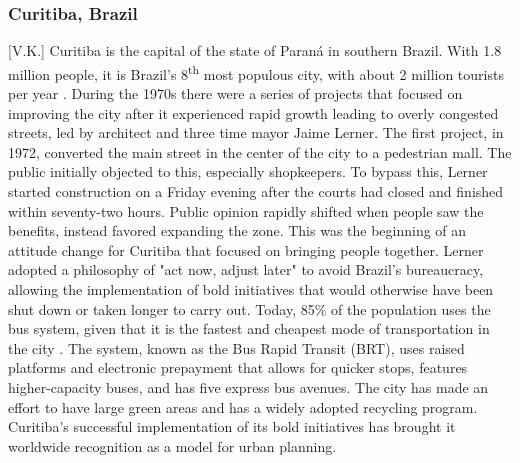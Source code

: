 \documentclass[12pt]{article}                       %
\begin{document}
\subsubsection{Curitiba, Brazil}[V.K.]
Curitiba is the capital of the state of Paraná in southern Brazil. With 1.8 million people, it is Brazil's 8\textsuperscript{th} most populous city, with about 2 million tourists per year \cite{Adler2016StoryCapital}. During the 1970s there were a series of projects that focused on improving the city after it experienced rapid growth leading to overly congested streets, led by architect and three time mayor Jaime Lerner. The first project, in 1972, converted the main street in the center of the city to a pedestrian mall. The public initially objected to this, especially shopkeepers. To bypass this, Lerner started construction on a Friday evening after the courts had closed and finished within seventy-two hours. Public opinion rapidly shifted when people saw the benefits, instead favored expanding the zone. This was the beginning of an attitude change for Curitiba that focused on bringing people together. Lerner adopted a philosophy of "act now, adjust later" to avoid Brazil's bureaucracy, allowing the implementation of bold initiatives that would otherwise have been shut down or taken longer to carry out. Today, 85\% of the population uses the bus system, given that it is the fastest and cheapest mode of transportation in the city \cite{Adler2016StoryCapital}. The system, known as the Bus Rapid Transit (BRT), uses raised platforms and electronic prepayment that allows for quicker stops, features higher-capacity buses, and has five express bus avenues. The city has made an effort to have large green areas and has a widely adopted recycling program. Curitiba's successful implementation of its bold initiatives has brought it worldwide recognition as a model for urban planning.
\end{document}
